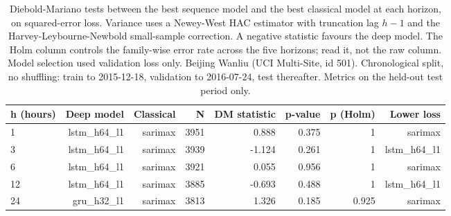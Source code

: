 \begin{table}[htbp]
\caption{Diebold-Mariano tests between the best sequence model and the best classical model at each horizon, on squared-error loss. Variance uses a Newey-West HAC estimator with truncation lag $h-1$ and the Harvey-Leybourne-Newbold small-sample correction. A negative statistic favours the deep model. The Holm column controls the family-wise error rate across the five horizons; read it, not the raw column. Model selection used validation loss only. Beijing Wanliu (UCI Multi-Site, id 501). Chronological split, no shuffling: train to 2015-12-18, validation to 2016-07-24, test thereafter. Metrics on the held-out test period only.}
\label{tab:diebold_mariano}
\begin{tabular}{lrrrrrrr}
\toprule
h (hours) & Deep model & Classical & N & DM statistic & p-value & p (Holm) & Lower loss \\
\midrule
1 & lstm\_h64\_l1 & sarimax & 3951 & 0.888 & 0.375 & 1 & sarimax \\
3 & lstm\_h64\_l1 & sarimax & 3939 & -1.124 & 0.261 & 1 & lstm\_h64\_l1 \\
6 & lstm\_h64\_l1 & sarimax & 3921 & 0.055 & 0.956 & 1 & sarimax \\
12 & lstm\_h64\_l1 & sarimax & 3885 & -0.693 & 0.488 & 1 & lstm\_h64\_l1 \\
24 & gru\_h32\_l1 & sarimax & 3813 & 1.326 & 0.185 & 0.925 & sarimax \\
\bottomrule
\end{tabular}
\end{table}
